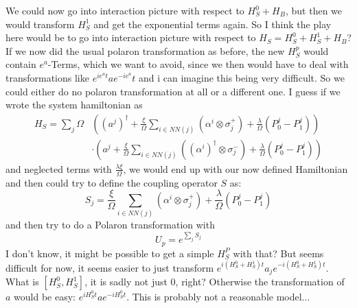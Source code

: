 	We could now go into interaction picture with respect to $H_S^0 + H_B$, but then we would transform $H_S^1$ and get the exponential terms again. So I think the play here would be to go into interaction picture with respect to $H_S = H_S^0 + H_S^1 + H_B$? \\
	If we now did the usual polaron transformation as before, the new $H_S^p$ would contain $e^a$-Terms, which we want to avoid, since we then would have to deal with transformations like $e^{ie^at} a e^{-ie^a}t$ and i can imagine this being very difficult. So we could either do no polaron transformation at all or a different one.
	I guess if we wrote the system hamiltonian as
	\begin{align*}
		H_S =	\sum_j \Omega &\left((a^j)^\dagger  +  \frac{\xi}{\Omega} \sum_{i \in NN(j)}^{} \left( \alpha^i \otimes \sigma_j^+ \right) + \frac{\lambda}{\Omega} (P_0^j - P_1^j)\right) \\
		& \cdot \left(a^j + \frac{\xi}{\Omega} \sum_{i \in NN(j)}^{} \left( (\alpha^i)^\dagger \otimes \sigma_j^- \right) + \frac{\lambda}{\Omega} (P_0^j - P_1^j) \right)
	\end{align*}
	and neglected terms with $\frac{\lambda \xi}{\Omega}$, we would end up with our now defined Hamiltonian and then could try to define the coupling operator $S$ as:
	\begin{equation}
		S_{j} =	\frac{\xi}{\Omega} \sum_{i \in NN(j)}^{} \left( \alpha^i \otimes \sigma_j^+ \right) + \frac{\lambda}{\Omega} (P_0^j - P_1^j)
	\end{equation}
	and then try to do a Polaron transformation with
	\begin{equation}
		U_p =	e^{\sum_{j}^{} S_{j}}
	\end{equation}
	I don't know, it might be possible to get a simple $H_S^P$ with that? But seems difficult for now, it seems easier to just transform  $e^{i (H_S^0 + H_S^1)t} a_j e^{-i (H_S^0 + H_S^1)t}$. What is $[H_S^0, H_S^1]$, it is sadly not just 0, right? Otherwise the transformation of $a$ would be easy:	$e^{iH_S^0t} a e^{-iH_S^0 t}$. This is probably not a reasonable model...
